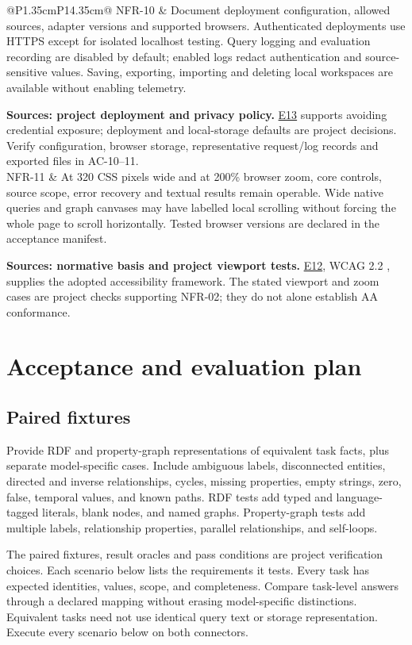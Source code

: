 \documentclass[11pt,a4paper]{article}
\newcommand{\evidence}[1]{\hyperlink{evidence:#1}{#1}}
\begin{document}
{\begin{longtable}{@{}P{1.35cm}P{14.35cm}@{}}
NFR-10 & Document deployment configuration, allowed sources, adapter versions and supported browsers. Authenticated deployments use HTTPS except for isolated localhost testing. Query logging and evaluation recording are disabled by default; enabled logs redact authentication and source-sensitive values. Saving, exporting, importing and deleting local workspaces are available without enabling telemetry.\par\smallskip \textbf{Sources: project deployment and privacy policy.} \evidence{E13} \citep{owasprest} supports avoiding credential exposure; deployment and local-storage defaults are project decisions. Verify configuration, browser storage, representative request/log records and exported files in AC-10--11.\\
NFR-11 & At 320 CSS pixels wide and at 200\% browser zoom, core controls, source scope, error recovery and textual results remain operable. Wide native queries and graph canvases may have labelled local scrolling without forcing the whole page to scroll horizontally. Tested browser versions are declared in the acceptance manifest.\par\smallskip \textbf{Sources: normative basis and project viewport tests.} \evidence{E12}, WCAG 2.2 \citep{wcag}, supplies the adopted accessibility framework. The stated viewport and zoom cases are project checks supporting NFR-02; they do not alone establish AA conformance.\\
\end{longtable}}

\section{Acceptance and evaluation plan}
\subsection{Paired fixtures}
Provide RDF and property-graph representations of equivalent task facts, plus separate model-specific cases. Include ambiguous labels, disconnected entities, directed and inverse relationships, cycles, missing properties, empty strings, zero, false, temporal values, and known paths. RDF tests add typed and language-tagged literals, blank nodes, and named graphs. Property-graph tests add multiple labels, relationship properties, parallel relationships, and self-loops.

The paired fixtures, result oracles and pass conditions are project verification choices. Each scenario below lists the requirements it tests. Every task has expected identities, values, scope, and completeness. Compare task-level answers through a declared mapping without erasing model-specific distinctions. Equivalent tasks need not use identical query text or storage representation. Execute every scenario below on both connectors.
\end{document}
